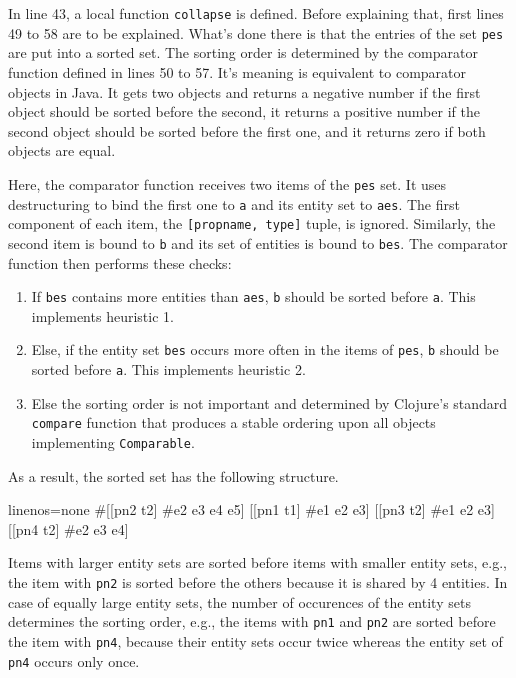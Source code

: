 \documentclass[11pt]{article}
\begin{document}
In line 43, a local function \verb|collapse| is defined.  Before explaining
that, first lines 49 to 58 are to be explained.  What's done there is that the
entries of the set \verb|pes| are put into a sorted set.  The sorting order is
determined by the comparator function defined in lines 50 to 57.  It's meaning
is equivalent to comparator objects in Java.  It gets two objects and returns a
negative number if the first object should be sorted before the second, it
returns a positive number if the second object should be sorted before the
first one, and it returns zero if both objects are equal.

Here, the comparator function receives two items of the \verb|pes| set.  It
uses destructuring to bind the first one to \verb|a| and its entity set to
\verb|aes|.  The first component of each item, the \verb|[propname, type]|
tuple, is ignored.  Similarly, the second item is bound to \verb|b| and its set
of entities is bound to \verb|bes|.  The comparator function then performs
these checks:

\begin{enumerate}
\item If \verb|bes| contains more entities than \verb|aes|, \verb|b| should be
  sorted before \verb|a|.  This implements heuristic 1.
\item Else, if the entity set \verb|bes| occurs more often in the items of
  \verb|pes|, \verb|b| should be sorted before \verb|a|.  This implements
  heuristic 2.
\item Else the sorting order is not important and determined by Clojure's
  standard \verb|compare| function that produces a stable ordering upon all
  objects implementing \verb|Comparable|.
\end{enumerate}

As a result, the sorted set has the following structure.

\begin{clojurecode*}{linenos=none}
#{[[pn2 t2] #{e2 e3 e4 e5}]
  [[pn1 t1] #{e1 e2 e3}]
  [[pn3 t2] #{e1 e2 e3}]
  [[pn4 t2] #{e2 e3 e4}]}
\end{clojurecode*}

Items with larger entity sets are sorted before items with smaller entity sets,
e.g., the item with \verb|pn2| is sorted before the others because it is shared
by 4 entities.  In case of equally large entity sets, the number of occurences
of the entity sets determines the sorting order, e.g., the items with
\verb|pn1| and \verb|pn2| are sorted before the item with \verb|pn4|, because
their entity sets occur twice whereas the entity set of \verb|pn4| occurs only
once.
\end{document}

